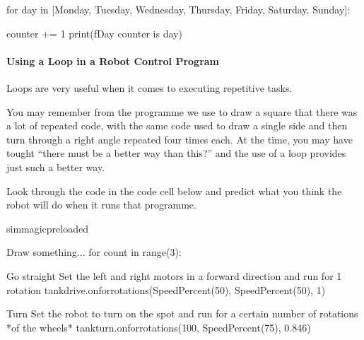 \documentclass[letterpaper,10pt,english]{sphinxmanual}
\begin{document}
{{\begin{sphinxVerbatim}[commandchars=\\\{\}]
for day in [\PYGZsq{}Monday\PYGZsq{}, \PYGZsq{}Tuesday\PYGZsq{}, \PYGZsq{}Wednesday\PYGZsq{},
            \PYGZsq{}Thursday\PYGZsq{}, \PYGZsq{}Friday\PYGZsq{}, \PYGZsq{}Saturday\PYGZsq{}, \PYGZsq{}Sunday\PYGZsq{}]:

    counter += 1
    print(f\PYGZdq{}Day \PYGZob{}counter\PYGZcb{} is \PYGZob{}day\PYGZcb{}\PYGZdq{})
\end{sphinxVerbatim}
}


\paragraph{Using a  Loop in a Robot Control Program}
\label{\detokenize{content/02_Robot_Lab/Section_00_01:Using-a-for..in..-Loop-in-a-Robot-Control-Program}}
Loops are very useful when it comes to executing repetitive tasks.

You may remember from the programme we use to draw a square that there was a lot of repeated code, with the same code used to draw a single side and then turn through a right angle repeated four times each. At the time, you may have tought “there must be a better way than this?” and the use of a loop provides just such a better way.

Look through the code in the code cell below and predict what you think the robot will do when it runs that programme.


{
\begin{sphinxVerbatim}[commandchars=\\\{\}]
\llap{\color{nbsphinxin}[ ]:\,\hspace{\fboxrule}\hspace{\fboxsep}}\PYGZpc{}\PYGZpc{}sim\PYGZus{}magic\PYGZus{}preloaded

\PYGZsh{} Draw something...
for count in range(3):

    \PYGZsh{}Go straight
    \PYGZsh{} Set the left and right motors in a forward direction
    \PYGZsh{} and run for 1 rotation
    tank\PYGZus{}drive.on\PYGZus{}for\PYGZus{}rotations(SpeedPercent(50), SpeedPercent(50), 1)

    \PYGZsh{}Turn
    \PYGZsh{} Set the robot to turn on the spot
    \PYGZsh{} and run for a certain number of rotations *of the wheels*
    tank\PYGZus{}turn.on\PYGZus{}for\PYGZus{}rotations(\PYGZhy{}100, SpeedPercent(75), 0.846)


\end{sphinxVerbatim}}}
\end{document}
